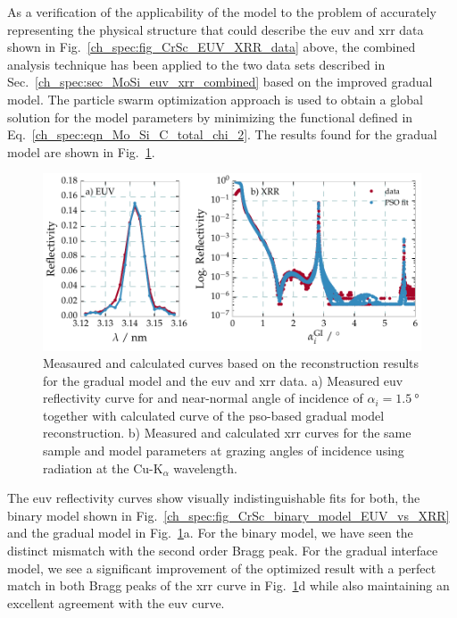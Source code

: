 As a verification of the applicability of the model to the problem of accurately representing the physical structure that could describe the \gls{euv} and \gls{xrr} data shown in Fig.~\ref{ch_spec:fig_CrSc_EUV_XRR_data} above, the combined analysis technique has been applied to the two data sets described in Sec.~\ref{ch_spec:sec_MoSi_euv_xrr_combined} based on the improved gradual model. The particle swarm optimization approach is used to obtain a global solution for the model parameters by minimizing the functional defined in Eq.~\eqref{ch_spec:eqn_Mo_Si_C_total_chi_2}. The results found for the gradual model are shown in Fig.~\ref{ch_spec:fig_CrSc_bianry_vs_gradual_model_fits}.
\begin{figure}[htbp]
  \centering
  \includegraphics[width=\textwidth]{img/CrSc_bianry_vs_gradual_model_fits}
  \caption[Reconstruction results for the gradual model based on EUV reflectivity and XRR.]{Measaured and calculated curves based on the reconstruction results for the gradual model and the \gls{euv} and \gls{xrr} data. a) Measured \gls{euv} reflectivity curve for and near-normal angle of incidence of $\alpha_i=\SI{1.5}{\degree}$ together with calculated curve of the \gls{pso}-based gradual model reconstruction. b) Measured and calculated \gls{xrr} curves for the same sample and model parameters at grazing angles of incidence using radiation at the Cu-K$_\alpha$ wavelength.}
  \label{ch_spec:fig_CrSc_bianry_vs_gradual_model_fits}
\end{figure}
The \gls{euv} reflectivity curves show visually indistinguishable fits for both, the binary model shown in Fig.~\ref{ch_spec:fig_CrSc_binary_model_EUV_vs_XRR} and the gradual model in Fig.~\ref{ch_spec:fig_CrSc_bianry_vs_gradual_model_fits}a. For the binary model, we have seen the distinct mismatch with the second order Bragg peak. For the gradual interface model, we see a significant improvement of the optimized result with a perfect match in both Bragg peaks of the \gls{xrr} curve in Fig.~\ref{ch_spec:fig_CrSc_bianry_vs_gradual_model_fits}d while also maintaining an excellent agreement with the \gls{euv} curve.

